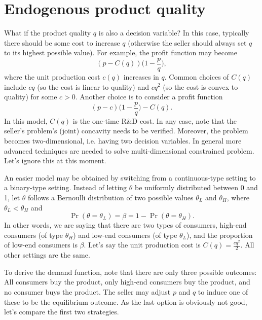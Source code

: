 \documentclass[12pt,a4paper]{article}
\begin{document}
\section{Endogenous product quality}

What if the product quality $q$ is also a decision variable? 
In this case, typically there should be some cost to increase $q$
(otherwise the seller should always set $q$ to its highest possible value). 
For example, the profit function may become 
\[
	(p - C(q))\bigg(1 - \frac{p}{q}\bigg), 
\]
where the unit production cost $c(q)$ increases in $q$. 
Common choices of $C(q)$ include $cq$ (so the cost is linear to quality)
and $cq^2$ (so the cost is convex to quality) for some $c > 0$.  
Another choice is to consider a profit function
\[
	(p - c)\bigg(1 - \frac{p}{q}\bigg) - C(q). 
\]
In this model, $C(q)$ is the one-time R\&D cost. In any case, 
note that the seller's problem's (joint) concavity needs to be verified. 
Moreover, the problem becomes two-dimensional, i.e. having two decision variables. 
In general more advanced techniques are needed to solve multi-dimensional 
constrained problem. Let's ignore this at this moment. 

An easier model may be obtained by switching from a continuous-type setting 
to a binary-type setting. Instead of letting $\theta$ be uniformly distributed 
between 0 and 1, let $\theta$ follows a Bernoulli distribution of two possible 
values $\theta_L$ and $\theta_H$, where $\theta_L < \theta_H$ and 
\[
	\Pr(\theta = \theta_L) = \beta = 1 - \Pr(\theta = \theta_H).
\]
In other words, we are saying that there are two types of consumers, 
high-end consumers (of type $\theta_H$) and low-end consumers (of type $\theta_L$), 
and the proportion of low-end consumers is $\beta$. 
Let's say the unit production cost is $C(q) = \frac{cq^2}{2}$. 
All other settings are the same. 

To derive the demand function, note that there are only three possible outcomes: 
All consumers buy the product, only high-end consumers buy the product, 
and no consumer buys the product. The seller may adjust $p$ and $q$ to induce
one of these to be the equilibrium outcome. As the last option is obviously not good, 
let's compare the first two strategies. 
\end{document}
